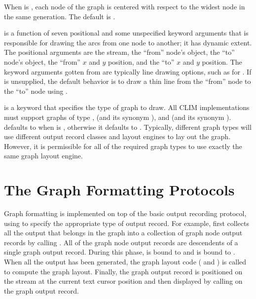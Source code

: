 When  is , each node of the graph is centered with
respect to the widest node in the same generation.  The default is .

 is a function of seven positional and some unspecified keyword
arguments that is responsible for drawing the arcs from one node to another; it
has dynamic extent.  The positional arguments are the stream, the ``from''
node's object, the ``to'' node's object, the ``from'' $x$ and $y$ position, and
the ``to'' $x$ and $y$ position.  The keyword arguments gotten from
 are typically line drawing options, such as for
.  If  is unsupplied, the default behavior is to
draw a thin line from the ``from'' node to the ``to'' node using
.

 is a keyword that specifies the type of graph to draw.  All
CLIM implementations must support graphs of type ,
 (and its synonym ), and
 (and its synonym ).  
defaults to  when  is , otherwise
it defaults to .  Typically, different graph types will use different
output record classes and layout engines to lay out the graph.  However, it is
permissible for all of the required graph types to use exactly the same graph
layout engine.


\section {The Graph Formatting Protocols}

Graph formatting is implemented on top of the basic output recording protocol,
using  to specify the appropriate type of output
record.  For example,  first collects all the output
that belongs in the graph into a collection of graph node output records by
calling .  All of the graph node output records are
descendents of a single graph output record.  During this phase,
 is bound to  and  is bound
to .  When all the output has been generated, the graph layout code
( and ) is called to compute the
graph layout.  Finally, the graph output record is positioned on the stream at
the current text cursor position and then displayed by calling  on
the graph output record.


